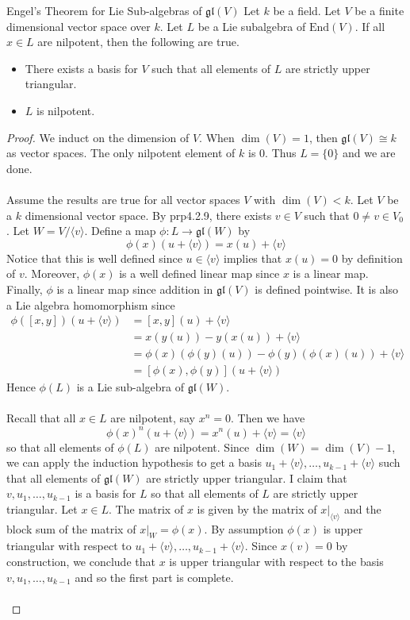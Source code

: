\documentclass[a4paper]{article}
\begin{document}
\begin{prp}{Engel's Theorem for Lie Sub-algebras of $\mathfrak{gl}(V)$}{} Let $k$ be a field. Let $V$ be a finite dimensional vector space over $k$. Let $L$ be a Lie subalgebra of $\text{End}(V)$. If all $x\in L$ are nilpotent, then the following are true. 
\begin{itemize}
\item There exists a basis for $V$ such that all elements of $L$ are strictly upper triangular. 
\item $L$ is nilpotent. 
\end{itemize} \tcbline
\begin{proof}
We induct on the dimension of $V$. When $\dim(V)=1$, then $\mathfrak{gl}(V)\cong k$ as vector spaces. The only nilpotent element of $k$ is $0$. Thus $L=\{0\}$ and we are done. \\~\\

Assume the results are true for all vector spaces $V$ with $\dim(V)<k$. Let $V$ be a $k$ dimensional vector space. By prp4.2.9, there exists $v\in V$ such that $0\neq v\in V_0$. Let $W=V/\langle v\rangle$. Define a map $\phi:L\to\mathfrak{gl}(W)$ by $$\phi(x)(u+\langle v\rangle)=x(u)+\langle v\rangle$$ Notice that this is well defined since $u\in\langle v\rangle$ implies that $x(u)=0$ by definition of $v$. Moreover, $\phi(x)$ is a well defined linear map since $x$ is a linear map. Finally, $\phi$ is a linear map since addition in $\mathfrak{gl}(V)$ is defined pointwise. It is also a Lie algebra homomorphism since 
\begin{align*}
\phi([x,y])(u+\langle v\rangle)&=[x,y](u)+\langle v\rangle\\
&=x(y(u))-y(x(u))+\langle v\rangle\\
&=\phi(x)(\phi(y)(u))-\phi(y)(\phi(x)(u))+\langle v\rangle\\
&=[\phi(x),\phi(y)](u+\langle v\rangle)
\end{align*}
Hence $\phi(L)$ is a Lie sub-algebra of $\mathfrak{gl}(W)$. \\~\\

Recall that all $x\in L$ are nilpotent, say $x^n=0$. Then we have $$\phi(x)^n(u+\langle v\rangle)=x^n(u)+\langle v\rangle=\langle v\rangle$$ so that all elements of $\phi(L)$ are nilpotent. Since $\dim(W)=\dim(V)-1$, we can apply the induction hypothesis to get a basis $u_1+\langle v\rangle,\dots,u_{k-1}+\langle v\rangle$ such that all elements of $\mathfrak{gl}(W)$ are strictly upper triangular. I claim that $v,u_1,\dots,u_{k-1}$ is a basis for $L$ so that all elements of $L$ are strictly upper triangular. Let $x\in L$. The matrix of $x$ is given by the matrix of $x|_{\langle v\rangle}$ and the block sum of the matrix of $x|_W=\phi(x)$. By assumption $\phi(x)$ is upper triangular with respect to $u_1+\langle v\rangle,\dots,u_{k-1}+\langle v\rangle$. Since $x(v)=0$ by construction, we conclude that $x$ is upper triangular with respect to the basis $v,u_1,\dots,u_{k-1}$ and so the first part is complete. \\~\\


\end{proof}
\end{prp}
\end{document}
